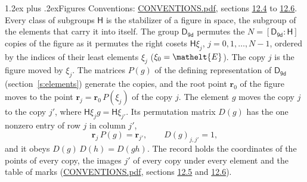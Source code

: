 \documentclass[10pt,a4paper]{article}
\makeatletter
\renewcommand\section{\@startsection{section}{1}{\z@}{-3ex plus -1ex minus -.2ex}%
  {1.2ex plus .2ex}{\normalfont\large\sffamily\bfseries\color{parttitle}}}
\numberwithin{equation}{section}
\newcommand{\eltfont}[1]{{\let\sigma\eltsigma\mathelt{#1}}}
\newcommand{\grp}[1]{\mathsf{#1}}
\newcommand{\cls}[1]{\eltfont{#1}}
\newcommand{\pointr}{\mathbf{r}}
\makeatother
\begin{document}
\section{Figures}\label{s:permutation}
Conventions: \href{../../CONVENTIONS.pdf}{CONVENTIONS.pdf}, sections \href{../../CONVENTIONS.pdf\#conv.12.4}{12.4} to \href{../../CONVENTIONS.pdf\#conv.12.6}{12.6}.
Every class of subgroups $\grp{H}$ is the stabilizer of a figure in space, the subgroup of the elements that carry it into itself. \label{n:local.orbit.size}\label{n:element.coset.least}\label{n:index.coset}The group $\grp{D_{9d}}$ permutes the $N = [\grp{D_{9d}} : \grp{H}]$ copies of the figure as it permutes the right cosets $\grp{H}\xi_j$, $j = 0, 1, \dots, N - 1$, ordered by the indices of their least elements $\xi_j$ ($\xi_0 = \cls{E}$). The copy $j$ is the figure moved by $\xi_j$. The matrices $P(g)$ of the defining representation of $\grp{D_{9d}}$ (section~\ref{s:elements}) generate the copies, and the root point $\pointr_0$ of the figure moves to the point $\pointr_j = \pointr_0\, P(\xi_j)$ of the copy $j$. \label{n:local.coset.image}The element $g$ moves the copy $j$ to the copy $j'$, where $\grp{H}\xi_j g = \grp{H}\xi_{j'}$. \label{n:local.matrix.permutation}Its permutation matrix $D(g)$ has the one nonzero entry of row $j$ in column $j'$,
\begin{equation}\label{e:perm.matrix}\pointr_j\, P(g) = \pointr_{j'}, \qquad D(g)_{j,j'} = 1,\end{equation}
and it obeys $D(g)\, D(h) = D(gh)$. The record holds the coordinates of the points of every copy, the images $j'$ of every copy under every element and the table of marks (\href{../../CONVENTIONS.pdf}{CONVENTIONS.pdf}, sections \href{../../CONVENTIONS.pdf\#conv.12.5}{12.5} and \href{../../CONVENTIONS.pdf\#conv.12.6}{12.6}).
\end{document}
